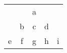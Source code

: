 \begin{table}[h!]  
  \begin{tabular}{|c|c|c|c|c|}
   \cline{3-3}
   \multicolumn{2}{c|}{} & a & \multicolumn{2}{c}{}\\
   \cline{2-4}
   \multicolumn{1}{c|}{} & b & c & d & \multicolumn{1}{c}{}\\
   \hline
   e & f & g & h & i\\
   \hline
  \end{tabular}
\end{table}
